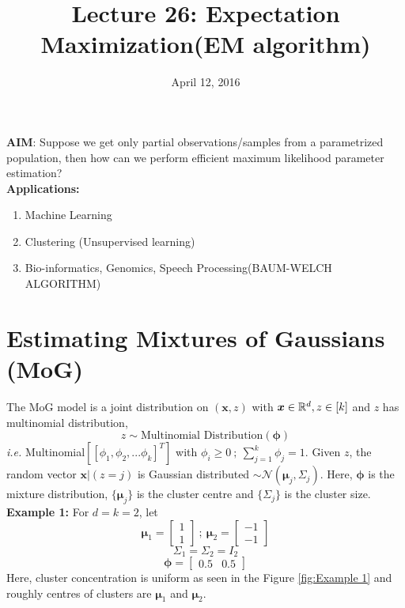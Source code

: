\documentclass[a4paper,english,12pt]{article}
\title{Lecture 26: Expectation Maximization(EM algorithm)}
\date{April 12, 2016}
\author{}
\begin{document}
\maketitle
\maketitle
\textbf{AIM}: Suppose we get only partial observations/samples from a parametrized population, then how can we perform efficient maximum likelihood parameter estimation?\\

\textbf{Applications:}
\begin{enumerate}
\item{Machine Learning}
\item{Clustering (Unsupervised learning)}
\item{Bio-informatics, Genomics, Speech Processing(BAUM-WELCH ALGORITHM)}
\end{enumerate}

\section{Estimating Mixtures of Gaussians (MoG)}
The MoG model is a joint distribution on $(\boldsymbol{x},z)$ with $\boldsymbol{x} \in \mathbb{R}^{d}, z\in [k] $ and $z$ has multinomial distribution,  $$z\sim \text{Multinomial Distribution}(\pmb{\phi})$$ 
\textit{i.e.} Multinomial$\left[[\phi_1, \phi_2, ... \phi_k]^T\right]$ with $\phi_i\geq0 ~; ~\sum_{j=1}^{k}\phi_j=1.$
Given $z$, the random vector $\boldsymbol{x}|(z=j)$ is Gaussian distributed $\sim \mathcal{N}(\boldsymbol{\mu}_j, \Sigma_j).$ Here, $\pmb{\phi}$ is the mixture distribution, $ \{\boldsymbol{\mu}_j\}$ is the cluster centre and $ \{ \Sigma_j\}$ is the cluster size.
\\

\textbf{Example 1:}
For $d=k=2$, let $$\boldsymbol{\mu}_1=\begin{bmatrix}
1\\
1
\end{bmatrix}
~;~ \boldsymbol{\mu}_2=\begin{bmatrix}
-1\\
-1
\end{bmatrix}$$
$$\Sigma_1=\Sigma_2=I_2$$
$$\pmb{\phi}=
\begin{bmatrix}
    0.5   &0.5
    \end{bmatrix}$$
Here, cluster concentration is uniform as seen in the Figure \ref{fig:Example 1} and roughly centres of clusters are $\boldsymbol{\mu}_1$ and $\boldsymbol{\mu}_2$.\\
\end{document}
